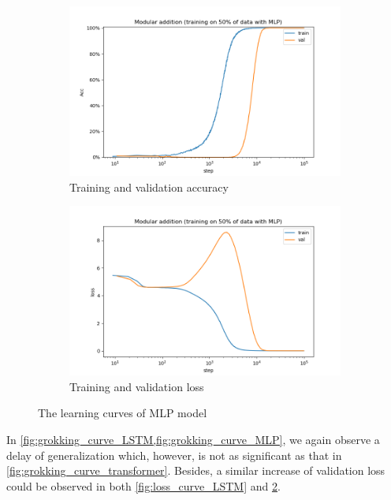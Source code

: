 \begin{figure}[!ht]
    \centering
    \begin{subfigure}{0.45\textwidth}
        \centering
        \includegraphics[width=\linewidth]{fig/grokking_curves/addition_50_MLP_step.png}
        \caption{Training and validation accuracy}
        \label{fig:grokking_curve_MLP}
    \end{subfigure}
    \begin{subfigure}{0.45\textwidth}
        \centering
        \includegraphics[width=\linewidth]{fig/loss_curves/addition_50_MLP_step.png}
        \caption{Training and validation loss}
        \label{fig:loss_curve_MLP}
    \end{subfigure}

    \caption{The learning curves of MLP model}
    \label{fig:acc_and_loss_MLP}
\end{figure}

In \cref{fig:grokking_curve_LSTM,fig:grokking_curve_MLP}, we again observe a delay of generalization which, however, is not as significant as that in \cref{fig:grokking_curve_transformer}.
Besides, a similar increase of validation loss could be observed in both \cref{fig:loss_curve_LSTM} and \cref{fig:loss_curve_MLP}.